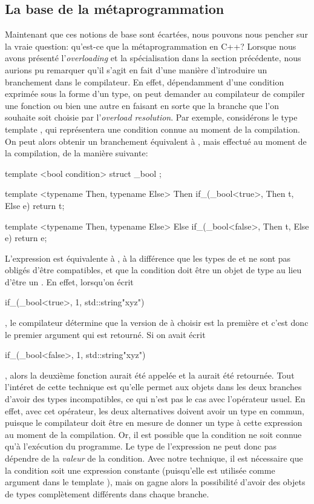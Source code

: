 \subsection{La base de la métaprogrammation}
Maintenant que ces notions de base sont écartées, nous pouvons nous pencher
sur la vraie question: qu'est-ce que la métaprogrammation en C++? Lorsque nous
avons présenté l'\textit{overloading} et la spécialisation dans la section
précédente, nous aurions pu remarquer qu'il s'agit en fait d'une manière
d'introduire un branchement dans le compilateur. En effet, dépendamment
d'une condition exprimée sous la forme d'un type, on peut demander au
compilateur de compiler une fonction ou bien une autre en faisant en sorte
que la branche que l'on souhaite soit choisie par l'\textit{overload resolution}.
Par exemple, considérons le type template , qui représentera une
condition connue au moment de la compilation. On peut alors obtenir un
branchement équivalent à , mais effectué au moment de
la compilation, de la manière suivante:
\begin{cpp}
    template <bool condition>
    struct _bool { };

    template <typename Then, typename Else>
    Then if_(_bool<true>, Then t, Else e) { return t; }

    template <typename Then, typename Else>
    Else if_(_bool<false>, Then t, Else e) { return e; }
\end{cpp}

L'expression  est équivalente à ,
à la différence que les types de  et  ne sont pas obligés d'être
compatibles, et que la condition doit être un objet de type 
au lieu d'être un . En effet, lorsqu'on écrit
\begin{cpp}
    if_(_bool<true>{}, 1, std::string{"xyz"})
\end{cpp}
, le compilateur détermine que la version de  à choisir est la
première et c'est donc le premier argument qui est retourné. Si on avait
écrit
\begin{cpp}
    if_(_bool<false>{}, 1, std::string{"xyz"})
\end{cpp}
, alors la deuxième fonction aurait été appelée et la  aurait
été retournée. Tout l'intéret de cette technique est qu'elle permet aux objets
dans les deux branches d'avoir des types incompatibles, ce qui n'est pas le cas
avec l'opérateur  usuel. En effet, avec cet opérateur, les deux
alternatives doivent avoir un type en commun, puisque le compilateur doit être
en mesure de donner un type à cette expression au moment de la compilation. Or,
il est possible que la condition ne soit connue qu'à l'exécution du programme.
Le type de l'expression ne peut donc pas dépendre de la \textit{valeur} de la
condition. Avec notre technique, il est nécessaire que la condition soit une
expression constante (puisqu'elle est utilisée comme argument dans le template
), mais on gagne alors la possibilité d'avoir des objets de types
complètement différents dans chaque branche.

